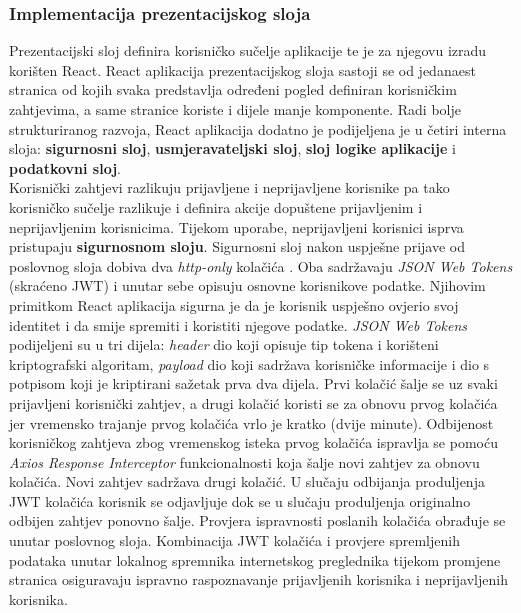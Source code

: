 \documentclass[times, utf8, zavrsni, numeric]{fer}
\begin{document}
			\subsubsection{Implementacija prezentacijskog sloja}
			Prezentacijski sloj definira korisničko sučelje aplikacije te je za njegovu izradu korišten React. React aplikacija prezentacijskog sloja sastoji se od jedanaest stranica od kojih svaka predstavlja određeni pogled definiran korisničkim zahtjevima, a same stranice koriste i dijele manje komponente. Radi bolje strukturiranog razvoja, React aplikacija dodatno je podijeljena je u četiri interna sloja: \textbf{sigurnosni sloj}, \textbf{usmjeravateljski sloj}, \textbf{sloj logike aplikacije} i \textbf{podatkovni sloj}.\\
			Korisnički zahtjevi razlikuju prijavljene i neprijavljene korisnike pa tako korisničko sučelje razlikuje i definira akcije dopuštene prijavljenim i neprijavljenim korisnicima. Tijekom uporabe, neprijavljeni korisnici isprva pristupaju \textbf{sigurnosnom sloju}. Sigurnosni sloj nakon uspješne prijave od poslovnog sloja dobiva dva \textit{http-only} kolačića . Oba sadržavaju \textit{JSON Web Tokens}\cite{jwt2021} (skraćeno JWT) i unutar sebe opisuju osnovne korisnikove podatke. Njihovim primitkom React aplikacija sigurna je da je korisnik uspješno ovjerio svoj identitet i da smije spremiti i koristiti njegove podatke.
		 	\textit{JSON Web Tokens} podijeljeni su u tri dijela: \textit{header} dio koji opisuje tip tokena i korišteni kriptografski algoritam, \textit{payload} dio koji sadržava korisničke informacije 
			i dio s potpisom koji je kriptirani sažetak prva dva dijela. Prvi kolačić šalje se uz svaki prijavljeni korisnički zahtjev, a drugi kolačić koristi se za obnovu prvog kolačića jer vremensko trajanje prvog kolačića vrlo je kratko (dvije minute). Odbijenost korisničkog zahtjeva zbog vremenskog isteka prvog kolačića ispravlja se pomoću \textit{Axios Response Interceptor} funkcionalnosti koja šalje novi zahtjev za obnovu kolačića. Novi zahtjev sadržava drugi kolačić. U slučaju odbijanja produljenja JWT kolačića korisnik se odjavljuje dok se u slučaju produljenja originalno odbijen zahtjev ponovno  šalje. Provjera ispravnosti poslanih kolačića obrađuje se unutar poslovnog sloja. Kombinacija JWT kolačića i provjere spremljenih podataka unutar lokalnog spremnika internetskog preglednika tijekom promjene stranica osiguravaju ispravno raspoznavanje prijavljenih korisnika i neprijavljenih korisnika.
\end{document}
